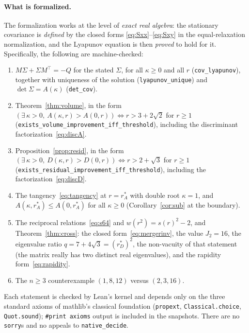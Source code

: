 \documentclass[11pt]{article}
\theoremstyle{plain}
\theoremstyle{remark}
\newcommand{\rA}{r_A^{*}}
\newcommand{\rD}{r_D^{*}}
\begin{document}
\paragraph{What is formalized.} The formalization works at the level of \emph{exact real
algebra}: the stationary covariance is \emph{defined} by the closed forms
\eqref{eq:Sxx}--\eqref{eq:Sxy} in the equal-relaxation normalization, and the Lyapunov equation
is then \emph{proved} to hold for it. Specifically, the following are machine-checked:

\begin{enumerate}\itemsep2pt
\item $M\Sigma+\Sigma M^{\top}=-Q$ for the stated $\Sigma$, for all $\kappa\ge0$ and all $r$
  (\texttt{cov\_lyapunov}), together with uniqueness of the solution
  (\texttt{lyapunov\_unique}) and $\det\Sigma=A(\kappa)$ (\texttt{det\_cov}).
\item Theorem~\ref{thm:volume}, in the form
  $(\exists\,\kappa>0,\ A(\kappa,r)>A(0,r))\iff r>3+2\sqrt2$ for $r\ge1$
  (\texttt{exists\_volume\_improvement\_iff\_threshold}), including the discriminant
  factorization~\eqref{eq:discA}.
\item Proposition~\ref{prop:resid}, in the form
  $(\exists\,\kappa>0,\ D(\kappa,r)>D(0,r))\iff r>2+\sqrt3$ for $r\ge1$
  (\texttt{exists\_residual\_improvement\_iff\_threshold}), including the
  factorization~\eqref{eq:discD}.
\item The tangency~\eqref{eq:tangency} at $r=\rA$ with double root $\kappa=1$, and
  $A(\kappa,\rA)\le A(0,\rA)$ for all $\kappa\ge0$ (Corollary~\ref{cor:sub} at the boundary).
\item The reciprocal relations~\eqref{eq:s64} and $w(r^2)=s(r)^2-2$, and
  Theorem~\ref{thm:cross}: the closed form~\eqref{eq:mergerinv}, the value $J_2=16$, the
  eigenvalue ratio $q=7+4\sqrt3=(\rD)^2$, the non-vacuity of that statement (the matrix really
  has two distinct real eigenvalues), and the rapidity form~\eqref{eq:rapidity}.
\item The $n\ge3$ counterexample $(1,8,12)$ versus $(2,3,16)$.
\end{enumerate}

Each statement is checked by Lean's kernel and depends only on the three standard axioms of
mathlib's classical foundation (\texttt{propext}, \texttt{Classical.choice},
\texttt{Quot.sound}); \texttt{\#print axioms} output is included in the snapshots. There are no
\texttt{sorry}s and no appeals to \texttt{native\_decide}.
\end{document}
